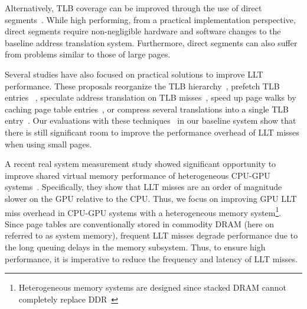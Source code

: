 Alternatively, TLB coverage can be improved through the use of direct
segments~\cite{Basu2013}. While high performing, from a practical
implementation perspective, direct segments require non-negligible
hardware and software changes to the baseline address translation
system. Furthermore, direct segments can also suffer from problems
similar to those of large pages.

Several studies have also focused on practical solutions to improve
LLT performance. These proposals reorganize the TLB
hierarchy~\cite{SharedLLT}, prefetch TLB entries
~\cite{prefTLBintercore, prefTLBgokul, prefTLBrecency,
power2014supporting}, speculate address translation on TLB
misses~\cite{spectlb}, speed up page walks by caching page table
entries~\cite{SkipPT, MMUcaches, power2014supporting}, or compress
several translations into a single TLB entry~\cite{COLT}. Our
evaluations with these techniques~\cite{SharedLLT, COLT, MMUcaches} in
our baseline system show that there is still significant room to
improve the performance overhead of LLT misses when using small pages.



A recent real system measurement study showed significant opportunity
to improve shared virtual memory performance of heterogeneous CPU-GPU
systems~\cite{vesley2016ispass}. Specifically, they show that LLT
misses are an order of magnitude slower on the GPU relative to the
CPU. Thus, we focus on improving GPU LLT miss overhead in CPU-GPU
systems with a heterogeneous memory system\footnote{Heterogeneous
memory systems are designed since stacked DRAM cannot completely
replace DDR~\cite{BEAR,moin2012}}. Since page tables are
conventionally stored in commodity DRAM (here on referred to as system
memory), frequent LLT misses degrade performance due to the long queuing delays
in the memory subsystem. Thus, to ensure high performance, it is imperative to reduce the frequency and latency of LLT misses.

